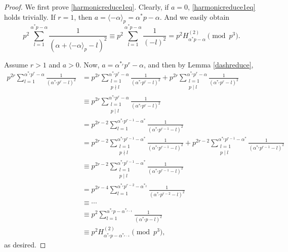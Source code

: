 \documentclass[12pt,reqno]{amsart}
\def\f{\frac}
\def\eq{\equiv}
\def\<{\langle}
\def\>{\rangle}
\theoremstyle{plain}
\theoremstyle{definition}
\theoremstyle{remark}
\numberwithin{equation}{section}
\begin{document}
\begin{proof}
We first prove \eqref{harmonicreduce1eq}. Clearly, if $a=0$, \eqref{harmonicreduce1eq} holds trivially. If $r=1$, then $a=\<-\alpha\>_p=\alpha^{\ast}p-\alpha$. And we easily obtain
$$
p^2\sum_{l=1}^{\alpha^{\ast}p-\alpha}\f{1}{(\alpha+\<-\alpha\>_p-l)^2}\eq p^2\sum_{l=1}^{\alpha^{\ast}p-\alpha}\f{1}{(-l)^2}=p^2H_{\alpha^{\ast}p-\alpha}^{(2)}\pmod{p^3}.
$$

Assume $r>1$ and $a>0$. Now, $a=\alpha^{\ast_r}p^r-\alpha$, and then by Lemma \ref{dashreduce},
\begin{align*}
p^{2r}\sum_{l=1}^{\alpha^{\ast_r}p^r-\alpha}\f{1}{(\alpha^{\ast_r}p^r-l)^2}&=p^{2r}\sum_{\substack{l=1\\ p\nmid l}}^{\alpha^{\ast_r}p^r-\alpha}\f{1}{(\alpha^{\ast_r}p^r-l)^2}+p^{2r}\sum_{\substack{l=1\\ p\mid l}}^{\alpha^{\ast_r}p^r-\alpha}\f{1}{(\alpha^{\ast_r}p^r-l)^2}\\
&\eq p^{2r}\sum_{\substack{l=1\\ p\mid l}}^{\alpha^{\ast_r}p^r-\alpha}\f{1}{(\alpha^{\ast_r}p^r-l)^2}\\
&=p^{2r-2}\sum_{l=1}^{\alpha^{\ast_r}p^{r-1}-\alpha^{\ast}}\f{1}{(\alpha^{\ast_r}p^{r-1}-l)^2}\\
&=p^{2r-2}\sum_{\substack{l=1\\ p\nmid l}}^{\alpha^{\ast_r}p^{r-1}-\alpha^{\ast}}\f{1}{(\alpha^{\ast_r}p^{r-1}-l)^2}+p^{2r-2}\sum_{\substack{l=1\\ p\mid l}}^{\alpha^{\ast_r}p^{r-1}-\alpha^{\ast}}\f{1}{(\alpha^{\ast_r}p^{r-1}-l)^2}\\
&\eq p^{2r-2}\sum_{\substack{l=1\\ p\mid l}}^{\alpha^{\ast_r}p^{r-1}-\alpha^{\ast}}\f{1}{(\alpha^{\ast_r}p^{r-1}-l)^2}\\
&=p^{2r-4}\sum_{l=1}^{\alpha^{\ast_r}p^{r-2}-\alpha^{\ast_2}}\f{1}{(\alpha^{\ast_r}p^{r-2}-l)^2}\\
&\eq\cdots\\
&\eq p^2\sum_{l=1}^{\alpha^{\ast_r}p-\alpha^{\ast_{r-1}}}\f{1}{(\alpha^{\ast_r}p-l)^2}\\
&\eq p^2H_{\alpha^{\ast_r}p-\alpha^{\ast_{r-1}}}^{(2)}\pmod{p^3},
\end{align*}
as desired.


\end{proof}
\end{document}
